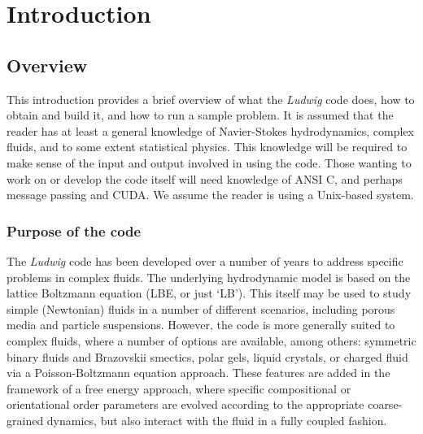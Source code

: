 %
%
%
%
%

\section{Introduction}

\subsection{Overview}

This introduction provides a brief overview of what the \textit{Ludwig} code
does, how to obtain and build it, and how to run a sample problem.
It is assumed that the reader has at least a general knowledge
of Navier-Stokes hydrodynamics, complex fluids, and to some
extent statistical physics. This knowledge will be required to make sense
of the input and output involved in using the code. Those wanting
to work on or develop the code itself will need knowledge of ANSI C,
and perhaps message passing and CUDA. We assume the reader is using
a Unix-based system.

\subsubsection{Purpose of the code}

The \textit{Ludwig} code has been developed over a number of
years to address specific problems in complex fluids. The underlying
hydrodynamic model is based on the lattice Boltzmann equation
(LBE, or just `LB'). This itself may be used to study simple
(Newtonian) fluids in a number of different scenarios, including porous
media and particle suspensions. However, the
code is more generally suited to complex fluids, where a number of
options are available, among others: symmetric binary fluids and
Brazovskii smectics,
polar gels, liquid crystals, or charged fluid via a Poisson-Boltzmann
equation approach. These features are added in the framework of a
free energy approach, where specific compositional or orientational
order parameters are evolved according to the appropriate
coarse-grained dynamics, but also interact with the fluid in a
fully coupled fashion.

